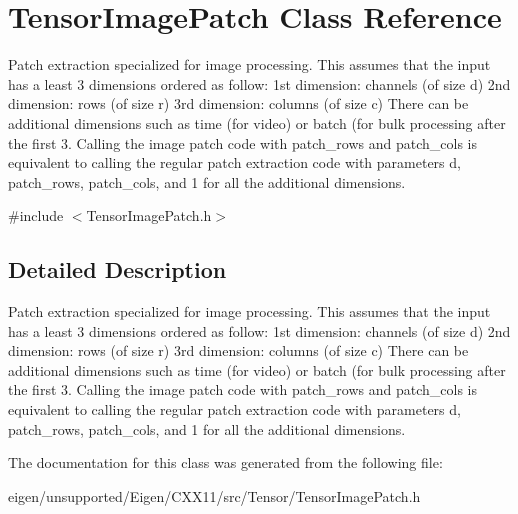 \hypertarget{class_tensor_image_patch}{}\section{Tensor\+Image\+Patch Class Reference}
\label{class_tensor_image_patch}


Patch extraction specialized for image processing. This assumes that the input has a least 3 dimensions ordered as follow\+: 1st dimension\+: channels (of size d) 2nd dimension\+: rows (of size r) 3rd dimension\+: columns (of size c) There can be additional dimensions such as time (for video) or batch (for bulk processing after the first 3. Calling the image patch code with patch\+\_\+rows and patch\+\_\+cols is equivalent to calling the regular patch extraction code with parameters d, patch\+\_\+rows, patch\+\_\+cols, and 1 for all the additional dimensions.  




{\ttfamily \#include $<$Tensor\+Image\+Patch.\+h$>$}



\subsection{Detailed Description}
Patch extraction specialized for image processing. This assumes that the input has a least 3 dimensions ordered as follow\+: 1st dimension\+: channels (of size d) 2nd dimension\+: rows (of size r) 3rd dimension\+: columns (of size c) There can be additional dimensions such as time (for video) or batch (for bulk processing after the first 3. Calling the image patch code with patch\+\_\+rows and patch\+\_\+cols is equivalent to calling the regular patch extraction code with parameters d, patch\+\_\+rows, patch\+\_\+cols, and 1 for all the additional dimensions. 

The documentation for this class was generated from the following file\+:\begin{DoxyCompactItemize}
\item 
eigen/unsupported/\+Eigen/\+C\+X\+X11/src/\+Tensor/\+Tensor\+Image\+Patch.\+h\end{DoxyCompactItemize}
